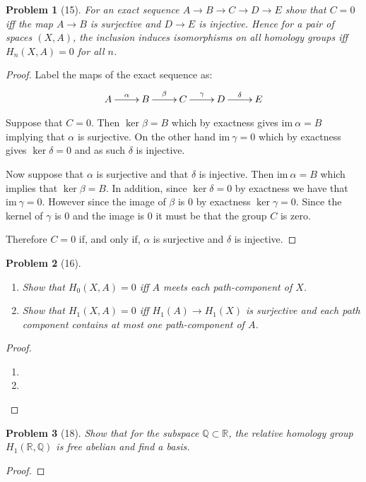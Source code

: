 \documentclass[10pt]{article}
\newcommand{\sk}{\vskip 10mm}
\newcommand{\bb}[1]{\mathbb{#1}}
\newcommand{\ima}{\mathrm{im}\ }
\theoremstyle{plain}
\newtheorem{problem}{Problem}
\theoremstyle{remark}
\begin{document}
\begin{problem}[15]
  For an exact sequence $A\rightarrow B\rightarrow C\rightarrow D\rightarrow E$ show that $C=0$ iff
  the map $A\rightarrow B$ is surjective and $D\rightarrow E$ is injective. Hence
  for a pair of spaces $(X,A)$, the inclusion induces isomorphisms
  on all homology groups iff $H_n(X,A)=0$ for all $n$.
\end{problem}

\begin{proof}
  Label the maps of the exact sequence as:
  \[
    \xymatrix{A \ar[r]^\alpha & B \ar[r]^\beta & C \ar[r]^\gamma & D \ar[r]^\delta & E}
  \]
  
  Suppose that $C=0$. Then $\ker \beta= B$ which by exactness gives
  $\ima \alpha= B$ implying that $\alpha$ is surjective. On the other hand
  $\ima \gamma=0$ which by exactness gives $\ker \delta=0$ and as such
  $\delta$ is injective.

  Now suppose that $\alpha$ is surjective and that $\delta$ is injective. Then
  $\ima \alpha = B$ which implies that $\ker \beta=B$. In addition, since
  $\ker\delta=0$ by exactness we have that $\ima \gamma=0$. However since
  the image of $\beta$ is $0$ by exactness $\ker \gamma=0$. Since the
  kernel of $\gamma$ is 0 and the image is 0 it must be that the group
  $C$ is zero.

  Therefore $C=0$ if, and only if, $\alpha$ is surjective and $\delta$ is
  injective.
\end{proof}

\sk

\begin{problem}[16]
  \begin{enumerate}
  \item[(a)] Show that $H_0(X,A)=0$ iff $A$ meets each path-component
    of $X$.
  \item[(b)] Show that $H_1(X,A)=0$ iff $H_1(A)\rightarrow H_1(X)$ is surjective and
    each path component contains at most one path-component of $A$.
  \end{enumerate}
\end{problem}

\begin{proof}\ \\
  \begin{enumerate}
  \item[(a)] 
  \item[(b)]
  \end{enumerate}
\end{proof}

\sk

\begin{problem}[18]
  Show that for the subspace $\bb{Q}\subset\bb{R}$, the relative homology group
  $H_1(\bb{R},\bb{Q})$ is free abelian and find a basis.
\end{problem}

\begin{proof}

\end{proof}

\end{document}
